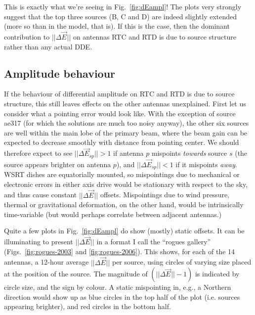 \documentclass[]{aa}
\newcommand{\jones}[2]{\vec {#1}_{#2}}
\begin{document}
This is exactly what we're seeing in Fig.~\ref{fig:dEampl}! The plots very strongly suggest that the top three sources (B, C and D) are indeed slightly extended (more so than in the model, that is). If this is the case, then the dominant contribution to $||\Delta\jones{E}{}||$ on antennas RTC and RTD is due to source structure rather than any actual DDE. 

\subsection{Amplitude behaviour}

If the behaviour of differential amplitude on RTC and RTD is due to source structure, this still leaves effects on the other antennas unexplained. First let us consider what a pointing error would look like. With the exception of source ae317 (for which the solutions are much too noisy anyway), the other six sources are well within the main lobe of the primary beam, where the beam gain can be expected to decrease smoothly with distance from pointing center. We should therefore expect to see $||\Delta\jones{E}{sp}||>1$ if antenna $p$ mispoints \emph{towards} source $s$ (the source appears brighter on antenna $p$), and $||\Delta\jones{E}{sp}||<1$ if it mispoints \emph{away}. WSRT dishes are equatorially mounted, so mispointings due to mechanical or electronic errors in either axis drive would be stationary with respect to the sky, and thus cause constant 
$||\Delta\jones{E}{}||$ offsets. Mispointings due to wind pressure, thermal or gravitational deformation, on the other hand, would be intrinsically time-variable (but would perhaps correlate between adjacent antennas.)

Quite a few plots in Fig.~\ref{fig:dEampl} do show (mostly) static offsets. It can be illuminating to present $||\Delta\jones{E}{}||$ in a format I call the ``rogues gallery'' (Figs.~\ref{fig:rogues-2003} and \ref{fig:rogues-2006}). This shows, for each of the 14 antennas, a 12-hour average $||\Delta\jones{E}{}||$ per source, using circles of varying size placed at the position of the source. The magnitude of $(||\Delta\jones{E}{}||-1)$ is indicated by circle size, and the sign by colour. A static mispointing in, e.g., a Northern direction would show up as blue circles in the top half of the plot (i.e. sources appearing brighter), and red circles in the bottom half.

\newlength{\roguewidth}
\setlength{\roguewidth}{.2\columnwidth} %
\end{document}
